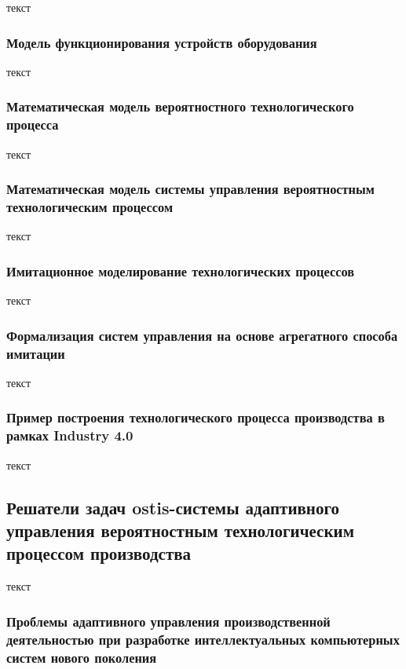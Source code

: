 текст

\subsubsection{Модель функционирования устройств оборудования}

текст

\subsubsection{Математическая модель вероятностного технологического процесса}

текст

\subsubsection{Математическая модель системы управления вероятностным технологическим процессом}

текст

\subsubsection{Имитационное моделирование технологических процессов}

текст

\subsubsection{Формализация систем управления на основе агрегатного способа имитации}

текст

\subsubsection{Пример построения технологического процесса производства в рамках Industry 4.0}

текст

\subsection{Решатели задач ostis-системы адаптивного управления вероятностным технологическим процессом производства}

текст

\subsubsection{Проблемы адаптивного управления производственной деятельностью при разработке интеллектуальных компьютерных систем нового поколения}

